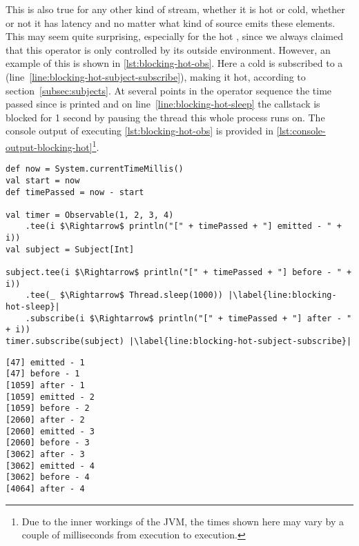 This is also true for any other kind of stream, whether it is hot or cold, whether or not it has latency and no matter what kind of source emits these elements. This may seem quite surprising, especially for the hot \obs, since we always claimed that this operator is only controlled by its outside environment. However, an example of this is shown in \autoref{lst:blocking-hot-obs}. Here a cold \obs is subscribed to a \subj (line~\ref{line:blocking-hot-subject-subscribe}), making it hot, according to section~\ref{subsec:subjects}. At several points in the operator sequence the time passed since  is printed and on line~\ref{line:blocking-hot-sleep} the callstack is blocked for 1 second by pausing the thread this whole process runs on. The console output of executing \autoref{lst:blocking-hot-obs} is provided in \autoref{lst:console-output-blocking-hot}\footnote{Due to the inner workings of the JVM, the times shown here may vary by a couple of milliseconds from execution to execution.}.

\begin{minipage}{\linewidth}
\begin{lstlisting}[style=ScalaStyle, caption={Applying callstack blocking on a hot \obs}, label={lst:blocking-hot-obs}]
def now = System.currentTimeMillis()
val start = now
def timePassed = now - start

val timer = Observable(1, 2, 3, 4)
    .tee(i $\Rightarrow$ println("[" + timePassed + "] emitted - " + i))
val subject = Subject[Int]

subject.tee(i $\Rightarrow$ println("[" + timePassed + "] before - " + i))
    .tee(_ $\Rightarrow$ Thread.sleep(1000)) |\label{line:blocking-hot-sleep}|
    .subscribe(i $\Rightarrow$ println("[" + timePassed + "] after - " + i))
timer.subscribe(subject) |\label{line:blocking-hot-subject-subscribe}|
\end{lstlisting}
\end{minipage}

\begin{minipage}{\linewidth}
\begin{lstlisting}[style=ScalaStyle, caption={Console output from \autoref{lst:blocking-hot-obs}}, label={lst:console-output-blocking-hot}]
[47] emitted - 1
[47] before - 1
[1059] after - 1
[1059] emitted - 2
[1059] before - 2
[2060] after - 2
[2060] emitted - 3
[2060] before - 3
[3062] after - 3
[3062] emitted - 4
[3062] before - 4
[4064] after - 4
\end{lstlisting}
\end{minipage}

